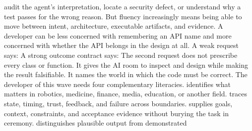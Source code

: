 {}audit the agent's interpretation, locate a security defect, or understand why\markdownRendererSoftLineBreak
{}a test passes for the wrong reason. But fluency increasingly means being able\markdownRendererSoftLineBreak
{}to move between intent, architecture, executable artifacts, and evidence. A\markdownRendererSoftLineBreak
{}developer can be less concerned with remembering an API name and more\markdownRendererSoftLineBreak
{}concerned with whether the API belongs in the design at all.\markdownRendererInterblockSeparator
{}\markdownRendererSectionBegin
{}\markdownRendererInterblockSeparator
{}A weak request says:\markdownRendererInterblockSeparator
{}\markdownRendererInterblockSeparator
{}A strong outcome contract says:\markdownRendererInterblockSeparator
{}\markdownRendererInterblockSeparator
{}The second request does not prescribe every class or function. It gives the AI\markdownRendererSoftLineBreak
{}room to inspect and design while making the result falsifiable. It names the\markdownRendererSoftLineBreak
{}world in which the code must be correct.\markdownRendererInterblockSeparator
{}
\markdownRendererSectionEnd \markdownRendererSectionBegin
{}\markdownRendererInterblockSeparator
{}The developer of this wave needs four complementary literacies.\markdownRendererInterblockSeparator
{}\markdownRendererOlBegin
{} identifies what matters in robotics, medicine, finance,\markdownRendererSoftLineBreak
{}media, education, or another field.\markdownRendererOlItemEnd 
{} traces state, timing, trust, feedback, and failure across\markdownRendererSoftLineBreak
{}boundaries.\markdownRendererOlItemEnd 
{} supplies goals, context, constraints, and\markdownRendererSoftLineBreak
{}acceptance evidence without burying the task in ceremony.\markdownRendererOlItemEnd 
{} distinguishes plausible output from demonstrated\markdownRendererSoftLineBreak
